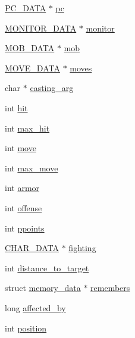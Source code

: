 \begin{DoxyCompactItemize}
\item 
\hyperlink{structs_8h_a1ea37f6e6569a3ddc74fa0cc97b970ce}{P\-C\-\_\-\-D\-A\-T\-A} $\ast$ \hyperlink{structchar__data_a8a2223d1455dee7690e5f59131963709}{pc}
\item 
\hyperlink{structs_8h_a9fbf59ec365a817eea88c66b03a01b32}{M\-O\-N\-I\-T\-O\-R\-\_\-\-D\-A\-T\-A} $\ast$ \hyperlink{structchar__data_a335f9ee3e7b8b9403db6556d39add971}{monitor}
\item 
\hyperlink{structs_8h_a22df42ea12f8103efe61fe6aa34085e0}{M\-O\-B\-\_\-\-D\-A\-T\-A} $\ast$ \hyperlink{structchar__data_a17cffa71790daaf4e9c7378021c2e491}{mob}
\item 
\hyperlink{structs_8h_af07de520e38ffdfaf1a55200c024917a}{M\-O\-V\-E\-\_\-\-D\-A\-T\-A} $\ast$ \hyperlink{structchar__data_aa1965cfddebd85daa94fe684a455ffe6}{moves}
\item 
char $\ast$ \hyperlink{structchar__data_a21f91d666b810a8d725f293b5437fdc3}{casting\-\_\-arg}
\item 
int \hyperlink{structchar__data_a28ce5ddb6e008c3595a62ce3d7245722}{hit}
\item 
int \hyperlink{structchar__data_afc4e4294539101e6113b09965e066f0a}{max\-\_\-hit}
\item 
int \hyperlink{structchar__data_a5b0b73827b303ab02d3539b41ebc2251}{move}
\item 
int \hyperlink{structchar__data_ade992470a603083a3426011e5b439833}{max\-\_\-move}
\item 
int \hyperlink{structchar__data_a2ef567ef14c44bb356f5c5678bfdb0af}{armor}
\item 
int \hyperlink{structchar__data_a817626cb6b56b7b5717a880cd6e0558b}{offense}
\item 
int \hyperlink{structchar__data_a59007f76e69aa5deb89d2129b78a9cb9}{ppoints}
\item 
\hyperlink{structs_8h_af33ed1e66e8541a08bed257124f50f31}{C\-H\-A\-R\-\_\-\-D\-A\-T\-A} $\ast$ \hyperlink{structchar__data_ad450a39995bd210790cf907c869bef16}{fighting}
\item 
int \hyperlink{structchar__data_a9b6e5d204b024ca1daa96d0609934e6c}{distance\-\_\-to\-\_\-target}
\item 
struct \hyperlink{structmemory__data}{memory\-\_\-data} $\ast$ \hyperlink{structchar__data_acf0ef91abb8d16dddd4df3dce28ed3d7}{remembers}
\item 
long \hyperlink{structchar__data_a437961a6017b4d422ac7e7c314be5a18}{affected\-\_\-by}
\item 
int \hyperlink{structchar__data_a08db17f138a70355ee13835cdef3eb3b}{position}

\end{DoxyCompactItemize}
